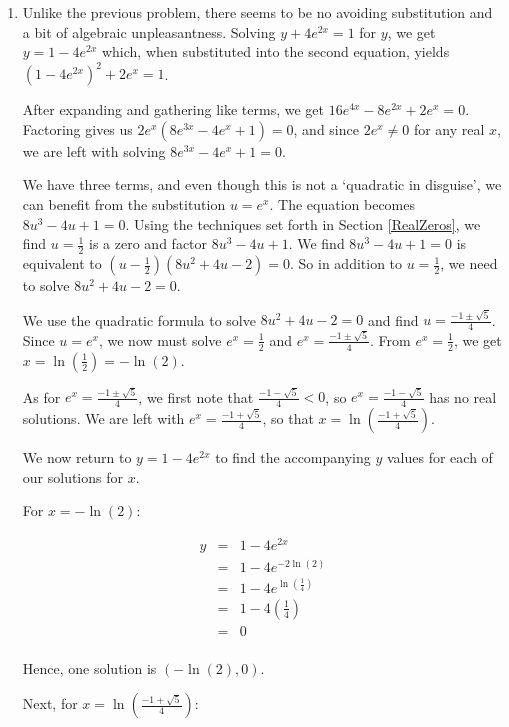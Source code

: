 \documentclass{ximera}
\begin{document}
\begin{example}
\begin{explanation}
\begin{enumerate}
\item  Unlike the previous problem, there seems to be no avoiding substitution and a bit of algebraic unpleasantness.  Solving $y+4e^{2x}=1$ for $y$, we get $y = 1 - 4e^{2x}$ which, when substituted into the second equation, yields $\left(1 - 4e^{2x}\right)^2 + 2e^{x} = 1$.  

After expanding and gathering like terms, we get $16e^{4x}-8e^{2x} + 2e^{x} = 0$.  Factoring gives us $2e^{x} \left(8e^{3x}-4e^{x} + 1\right) = 0$, and since $2e^{x} \neq 0$ for any real $x$, we are left with solving $8e^{3x}-4e^{x} + 1=0$.  

We have three terms, and even though this is not a `quadratic in disguise', we can benefit from the substitution $u = e^{x}$.  The equation becomes  $8u^3-4u+1=0$.  Using the techniques set forth in Section \ref{RealZeros}, we find $u = \frac{1}{2}$ is a zero and factor $8u^3-4u+1$.   We find $8u^3-4u+1=0$ is equivalent to $\left(u - \frac{1}{2}\right) \left(8u^2+4u-2\right) =0$.  So  in addition to $u = \frac{1}{2}$, we need to solve  $8u^2+4u-2=0$.

We use the quadratic formula to solve $8u^2+4u-2=0$  and find $u = \frac{-1 \pm \sqrt{5}}{4}$.  Since $u = e^{x}$, we now must solve $e^{x} = \frac{1}{2}$ and $e^{x} =  \frac{-1 \pm \sqrt{5}}{4}$.  From $e^{x} = \frac{1}{2}$, we get $x = \ln\left(\frac{1}{2}\right) = -\ln(2)$.  

As for $e^{x} =  \frac{-1 \pm \sqrt{5}}{4}$, we first note that $ \frac{-1 - \sqrt{5}}{4} < 0$, so $e^{x} =  \frac{-1 - \sqrt{5}}{4}$ has no real solutions.  We are left with $e^{x} =  \frac{-1 + \sqrt{5}}{4}$, so that $x = \ln\left(\frac{-1 + \sqrt{5}}{4}\right)$.  

We now return to $y = 1 - 4e^{2x}$ to find the accompanying $y$ values for each of our solutions for $x$.

For $x=-\ln(2)$: 

\[\begin{array}{rcl}
y & = & 1 - 4e^{2x}\\
  & = & 1 - 4e^{-2\ln(2)} \\
  & = & 1 - 4e^{\ln\left(\frac{1}{4}\right)} \\
  & = & 1 - 4\left(\frac{1}{4}\right) \\
  & = & 0 \\
\end{array}\]

Hence, one solution is  $(-\ln(2), 0)$.  

Next, for $x = \ln\left(\frac{-1 + \sqrt{5}}{4}\right)$:


\end{enumerate}
\end{explanation}
\end{example}
\end{document}
